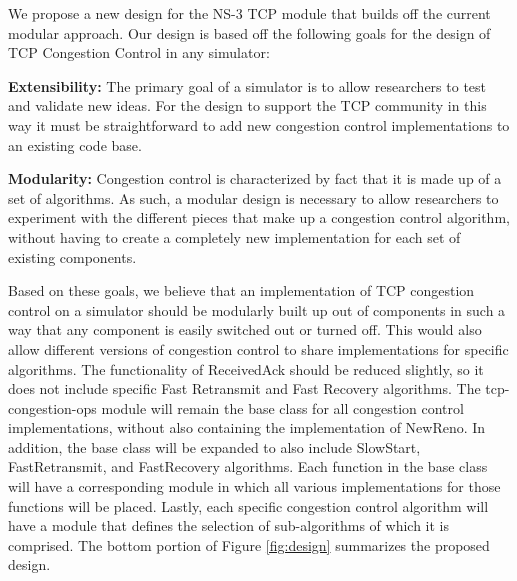 \documentclass[conference]{IEEEtran}
\begin{document}
We propose a new design for the NS-3 TCP module that builds off the current modular approach. Our design is based off the following goals for the design of TCP Congestion Control in any simulator:

\textbf{Extensibility:} The primary goal of a simulator is to allow researchers to test and validate new ideas. For the design to support the TCP community in this way it must be straightforward to add new congestion control implementations to an existing code base.

\textbf{Modularity:} Congestion control is characterized by fact that it is made up of a set of algorithms. As such, a modular design is necessary to allow researchers to experiment with the different pieces that make up a congestion control algorithm, without having to create a completely new implementation for each set of existing components. 

Based on these goals, we believe that an implementation of TCP congestion control on a simulator should be modularly built up out of components in such a way that any component is easily switched out or turned off. This would also allow different versions of congestion control to share implementations for specific algorithms. The functionality of ReceivedAck should be reduced slightly, so it does not include specific Fast Retransmit and Fast Recovery algorithms. The tcp-congestion-ops module will remain the base class for all congestion control implementations, without also containing the implementation of NewReno. In addition, the base class will be expanded to also include SlowStart, FastRetransmit, and FastRecovery algorithms. Each function in the base class will have a corresponding module in which all various implementations for those functions will be placed. Lastly, each specific congestion control algorithm will have a module that defines the selection of sub-algorithms of which it is comprised. The bottom portion of Figure \ref{fig:design} summarizes the proposed design. 
\end{document}
